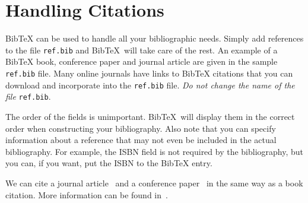 
\newcommand{\BibTeX}{Bib\TeX}

\chapter{Handling Citations}\label{chap:refs}

\BibTeX{} can be used to handle all your bibliographic needs.  Simply add
references to the file \texttt{ref.bib} and \BibTeX\ will take care of
the rest.  An example of a \BibTeX{} book, conference paper and journal
article are given in the sample \texttt{ref.bib} file.  Many online
journals have links to \BibTeX{} citations that you can download and
incorporate into the \texttt{ref.bib} file. {\it Do not change the name of
  the file} \texttt{ref.bib}.

The order of the fields is unimportant. \BibTeX\ will display them
in the correct order when constructing your bibliography.  Also note
that you can specify information about a reference that may not even be
included in the actual bibliography.  For example, the ISBN field is not
required by the bibliography, but you can, if you want, put the ISBN to
the \BibTeX{} entry.

We can cite a journal article~\cite{someguy2002} and a conference
paper~\cite{LastName1996} in the same way as a book citation.  More
information can be found in~\cite{lam1994}.
